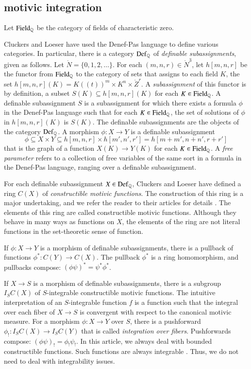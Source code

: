 \subsection{motivic integration}

Let ${\operatorname{Field}}_{\mathbb{Q}}$ be the category of fields of characteristic zero.

Cluckers and Loeser have used the Denef-Pas language to define various
categories.  In particular, there is a category ${\operatorname{Def}}_{\mathbb{Q}}$ of {\it
  definable subassignments}, given as follows.  Let $\ring{N}=\{0,1,2,\ldots\}$. 
For each
$(m,n,r)\in\ring{N}^3$, let $h[m,n,r]$ be the functor from
${\operatorname{Field}}_{\mathbb{Q}}$ to the category of sets that assigns to each field
$K$, the set $h[m,n,r](K)=K((t))^m\times K^n\times \ring{Z}^r$.  A
{\it subassignment} of this functor is by definition, a subset $S(K)
\subseteq h[m,n,r](K)$ for each $K\in{\operatorname{Field}}_{\mathbb{Q}}$.  A definable
subassignment $S$ is a subassignment for which there exists a formula
$\phi$ in the Denef-Pas language such that for each
$K\in{\operatorname{Field}}_{\mathbb{Q}}$, the set of solutions of $\phi$ in $h[m,n,r](K)$
is $S(K)$.  The definable subassignments are the objects of the
category ${\operatorname{Def}}_{\mathbb{Q}}$.  A morphism $\phi:X\to Y$ is a definable
subassignment
\[
\phi\subseteq X\times Y
\subseteq h[m,n,r]\times h[m',n',r'] = h[m+m',n+n',r+r']
\]
that is the graph of a function $X(K)\to Y(K)$ for each $K\in
{\operatorname{Field}}_{\mathbb{Q}}$.
A {\it free parameter} refers to a collection of free variables of the
same sort in a formula in the Denef-Pas language, ranging over a
definable subassignment.  

For each definable subassignment $X\in {\operatorname{Def}}_{\mathbb{Q}}$, Cluckers and
Loeser have defined a ring $C(X)$ of {\it constructible motivic
  functions}.  The construction of this ring is a major undertaking,
and we refer the reader to their articles for details
\cite{cluckers2008constructible}.  The elements of this ring are
called constructible motivic functions.  Although they behave in many
ways as functions on $X$, the elements of the ring are not literal
functions in the set-theoretic sense of function.

If $\phi:X\to Y$ is a morphism of definable subassignments, there is a
pullback of functions $\phi^*:C(Y)\to C(X)$.  The pullback $\phi^*$ is
a ring homomorphism, and pullbacks compose: $(\phi\psi)^* = \psi^*
\phi^*$.

If $X\to S$ is a morphism of definable subassignments, there is a
subgroup $I_S C(X)$ of $S$-integrable constructible motivic functions.
The intuitive interpretation of an $S$-integrable function $f$ is a
function such that the integral over each fiber of $X\to S$ is
convergent with respect to the canonical motivic measure.  For a
morphism $\phi: X\to Y$ over $S$, there is a pushforward
$\phi_!:I_SC(X)\to I_SC(Y)$ that is called {\it integration over
  fibers}.  Pushforwards compose: $(\phi\psi)_! = \phi_!\psi_!$.  In
this article, we always deal with bounded constructible functions.
Such functions are always integrable
\cite[Prop~12.2.2]{cluckers2008constructible}.  Thus, we do not need
to deal with integrability issues.

